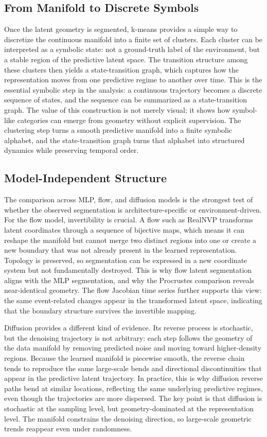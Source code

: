 \documentclass[11pt]{article}
\begin{document}
\subsection{From Manifold to Discrete Symbols}
Once the latent geometry is segmented, k-means provides a simple way to discretize the continuous manifold into a finite set of clusters. Each cluster can be interpreted as a symbolic state: not a ground-truth label of the environment, but a stable region of the predictive latent space. The transition structure among these clusters then yields a state-transition graph, which captures how the representation moves from one predictive regime to another over time. This is the essential symbolic step in the analysis: a continuous trajectory becomes a discrete sequence of states, and the sequence can be summarized as a state-transition graph. The value of this construction is not merely visual; it shows how symbol-like categories can emerge from geometry without explicit supervision. The clustering step turns a smooth predictive manifold into a finite symbolic alphabet, and the state-transition graph turns that alphabet into structured dynamics while preserving temporal order.

\subsection{Model-Independent Structure}
The comparison across MLP, flow, and diffusion models is the strongest test of whether the observed segmentation is architecture-specific or environment-driven. For the flow model, invertibility is crucial. A flow such as RealNVP transforms latent coordinates through a sequence of bijective maps, which means it can reshape the manifold but cannot merge two distinct regions into one or create a new boundary that was not already present in the learned representation. Topology is preserved, so segmentation can be expressed in a new coordinate system but not fundamentally destroyed. This is why flow latent segmentation aligns with the MLP segmentation, and why the Procrustes comparison reveals near-identical geometry. The flow Jacobian time series further supports this view: the same event-related changes appear in the transformed latent space, indicating that the boundary structure survives the invertible mapping.

Diffusion provides a different kind of evidence. Its reverse process is stochastic, but the denoising trajectory is not arbitrary: each step follows the geometry of the data manifold by removing predicted noise and moving toward higher-density regions. Because the learned manifold is piecewise smooth, the reverse chain tends to reproduce the same large-scale bends and directional discontinuities that appear in the predictive latent trajectory. In practice, this is why diffusion reverse paths bend at similar locations, reflecting the same underlying predictive regimes, even though the trajectories are more dispersed. The key point is that diffusion is stochastic at the sampling level, but geometry-dominated at the representation level. The manifold constrains the denoising direction, so large-scale geometric trends reappear even under randomness.
\end{document}
